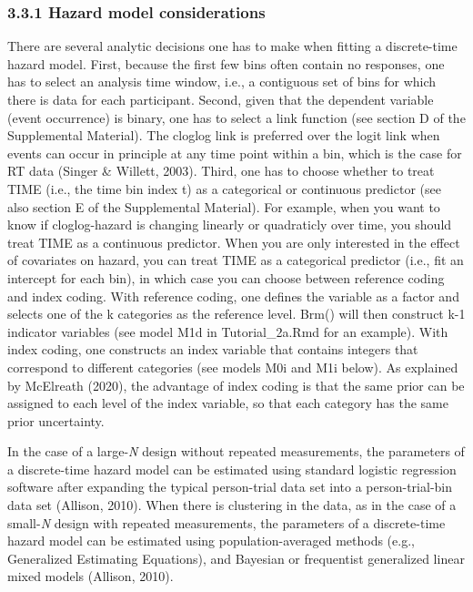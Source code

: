\documentclass[
  man, donotrepeattitle,floatsintext]{apa6}
\begin{document}
\subsubsection{3.3.1 Hazard model considerations}\label{hazard-model-considerations}

There are several analytic decisions one has to make when fitting a discrete-time hazard model. First, because the first few bins often contain no responses, one has to select an analysis time window, i.e., a contiguous set of bins for which there is data for each participant. Second, given that the dependent variable (event occurrence) is binary, one has to select a link function (see section D of the Supplemental Material). The cloglog link is preferred over the logit link when events can occur in principle at any time point within a bin, which is the case for RT data (Singer \& Willett, 2003). Third, one has to choose whether to treat TIME (i.e., the time bin index t) as a categorical or continuous predictor (see also section E of the Supplemental Material). For example, when you want to know if cloglog-hazard is changing linearly or quadraticly over time, you should treat TIME as a continuous predictor.
When you are only interested in the effect of covariates on hazard, you can treat TIME as a categorical predictor (i.e., fit an intercept for each bin), in which case you can choose between reference coding and index coding. With reference coding, one defines the variable as a factor and selects one of the k categories as the reference level. Brm() will then construct k-1 indicator variables (see model M1d in Tutorial\_2a.Rmd for an example). With index coding, one constructs an index variable that contains integers that correspond to different categories (see models M0i and M1i below). As explained by McElreath (2020), the advantage of index coding is that the same prior can be assigned to each level of the index variable, so that each category has the same prior uncertainty.

In the case of a large-\emph{N} design without repeated measurements, the parameters of a discrete-time hazard model can be estimated using standard logistic regression software after expanding the typical person-trial data set into a person-trial-bin data set (Allison, 2010). When there is clustering in the data, as in the case of a small-\emph{N} design with repeated measurements, the parameters of a discrete-time hazard model can be estimated using population-averaged methods (e.g., Generalized Estimating Equations), and Bayesian or frequentist generalized linear mixed models (Allison, 2010).
\end{document}
